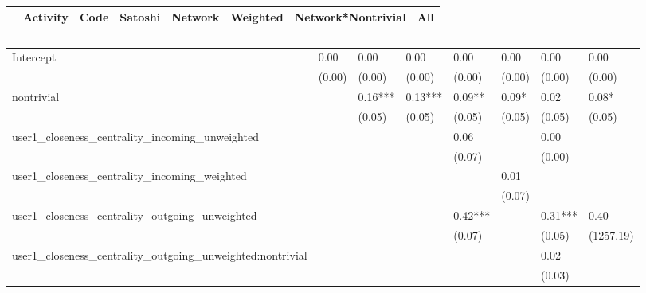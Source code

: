 \begin{table}
\caption{}
\begin{center}
\begin{tabular}{lccccccc}
\hline
                                                          & Activity &   Code  & Satoshi & Network & Weighted & Network*Nontrivial &    All     \\
\hline
\hline
\end{tabular}
\begin{tabular}{llllllll}
Intercept                                                 & 0.00     & 0.00    & 0.00    & 0.00    & 0.00     & 0.00               & 0.00       \\
                                                          & (0.00)   & (0.00)  & (0.00)  & (0.00)  & (0.00)   & (0.00)             & (0.00)     \\
nontrivial                                                &          & 0.16*** & 0.13*** & 0.09**  & 0.09*    & 0.02               & 0.08*      \\
                                                          &          & (0.05)  & (0.05)  & (0.05)  & (0.05)   & (0.05)             & (0.05)     \\
user1_closeness_centrality_incoming_unweighted            &          &         &         & 0.06    &          & 0.00               &            \\
                                                          &          &         &         & (0.07)  &          & (0.00)             &            \\
user1_closeness_centrality_incoming_weighted              &          &         &         &         & 0.01     &                    &            \\
                                                          &          &         &         &         & (0.07)   &                    &            \\
user1_closeness_centrality_outgoing_unweighted            &          &         &         & 0.42*** &          & 0.31***            & 0.40       \\
                                                          &          &         &         & (0.07)  &          & (0.05)             & (1257.19)  \\
user1_closeness_centrality_outgoing_unweighted:nontrivial &          &         &         &         &          & 0.02               &            \\
                                                          &          &         &         &         &          & (0.03)             &            \\

\end{tabular}
\end{center}
\end{table}
